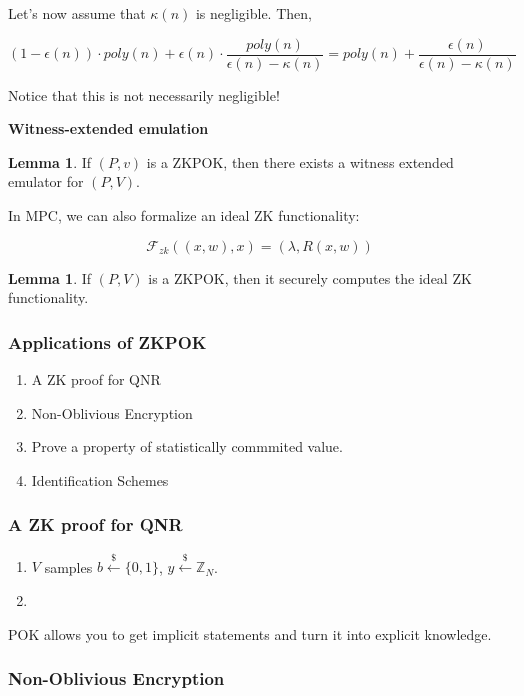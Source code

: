 \documentclass{article}
\theoremstyle{definition}
\newtheorem{lemma}[theorem]{Lemma}
\newcommand{\Z}{\mathbb{Z}}
\begin{document}
Let's now assume that $\kappa(n)$ is negligible. Then,

\[ (1 - \epsilon(n)) \cdot poly(n) + \epsilon(n) \cdot \frac{poly(n)}{\epsilon(n) - \kappa(n)} = poly(n) + \frac{\epsilon(n)}{\epsilon(n) - \kappa(n)}\]

Notice that this is not necessarily negligible!

\textbf{Witness-extended emulation}

\begin{lemma}
    If $(P,v)$ is a ZKPOK, then there exists a witness extended emulator for $(P,V)$.
\end{lemma}

In MPC, we can also formalize an ideal ZK functionality:

\[ \mathcal{F}_{zk}((x,w),x) = (\lambda, R(x,w))\]

\begin{lemma}
    If $(P,V)$ is a ZKPOK, then it securely computes the ideal ZK functionality.
\end{lemma}

\subsubsection{Applications of ZKPOK}

\begin{enumerate}
    \item A ZK proof for QNR
    \item Non-Oblivious Encryption
    \item Prove a property of statistically commmited value.
    \item Identification Schemes
\end{enumerate}

\subsubsection{A ZK proof for QNR}

\begin{enumerate}
    \item $V$ samples $b \xleftarrow{\$} \{0,1\}$, $y \xleftarrow{\$} \Z_{N}$.
    \item 
\end{enumerate}

POK allows you to get implicit statements and turn it into explicit knowledge.

\subsubsection{Non-Oblivious Encryption}
\end{document}
